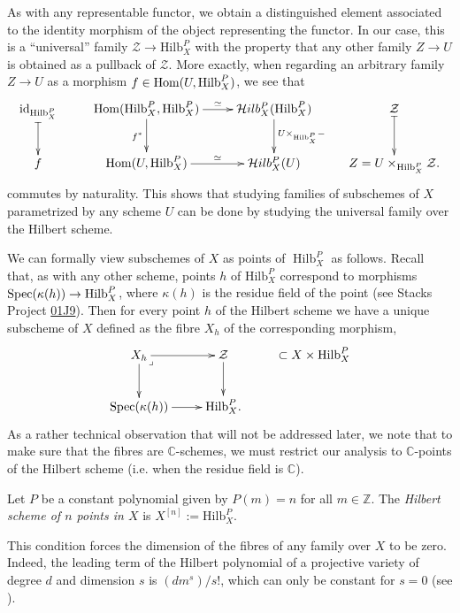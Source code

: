 As with any representable functor,
we obtain a distinguished element associated
to the identity morphism
of the object representing the functor.
In our case, this is a
``universal'' family $\mathcal{Z} \to
\text{Hilb}^P_X$
with the property that any other family $Z
\to U$ is obtained as a pullback
of $\mathcal{Z}$.
More exactly, when regarding an arbitrary
family $Z \to U$ as a morphism
$f \in \mathop{\mathrm{Hom}}\nolimits(U,\text{Hilb}^P_X)$, we see that
$$
\xymatrix{
\text{id}_{\text{Hilb}^P_X}\ar@{|->}[d]
&\Hom(\text{Hilb}^P_X,\text{Hilb}^P_X)\ar[r]^-{\simeq}\ar[d]_{f^*}
&\mathcal{H}ilb^P_X(\text{Hilb}^P_X)\ar[d]^{U\times_{\text{Hilb}_X^P}-}
&\mathcal{Z}\ar@{|->}[d]\\
f&\Hom(U,\text{Hilb}^P_X)\ar[r]^-{\simeq}
 &\mathcal{H}ilb^P_X(U)&
Z=U\times_{\text{Hilb}_X^P}\mathcal{Z}.
}
$$
commutes by naturality.
This shows that studying families of
subschemes of $X$ parametrized by any
scheme $U$ can be done by studying the
universal family
over the Hilbert scheme.

We can formally view subschemes of $X$
as points of $\operatorname{Hilb}_X^P$ as
follows.
Recall that, as with any other scheme,
points $h$ of $\text{Hilb}_X^P$ correspond
to morphisms
$\mathop{\mathrm{Spec}}(\kappa(h)) \to \text{Hilb}^P_X$,
where $\kappa(h)$ is the residue field of
the point
(see Stacks Project
\href{https://stacks.math.columbia.edu/tag/01J9}{01J9}).
Then for every point $h$ of the Hilbert
scheme
we have a unique subscheme
of $X$ defined as the fibre $X_h$
of the corresponding morphism,
$$
\xymatrix{
X_h\ar[r]\ar[d]\ar@{}[dr]|<{\lrcorner}&\mathcal{Z}\ar[d]
& \subset X \times \text{Hilb}^P_X\\
\Spec(\kappa(h))\ar[r]&\text{Hilb}^P_X.
}
$$
As a rather technical observation that will
not be
addressed later, we note that
to make sure that the fibres are
$\mathbb{C}$-schemes,
we must restrict our analysis to
$\mathbb{C}$-points
of the Hilbert scheme (i.e. when the residue
field is $\mathbb{C}$).

\begin{definition}
\label{definition-hilbert-scheme-of-points}
Let $P$ be a constant polynomial given by
$P(m)=n$ for all $m \in \mathbb{Z}$.
The {\it Hilbert scheme of $n$ points in
$X$} is $X^{[n]}:=\text{Hilb}^P_X$.
\end{definition}

\noindent
This condition forces the dimension of the
fibres of any family
over $X$ to be zero. Indeed, the leading term
of the Hilbert polynomial of a projective
variety of degree $d$
and dimension $s$ is $(dm^s)/s!$, which can
only be constant
for $s=0$ (see \cite[Exercise
1.13]{HarrMorr}).

